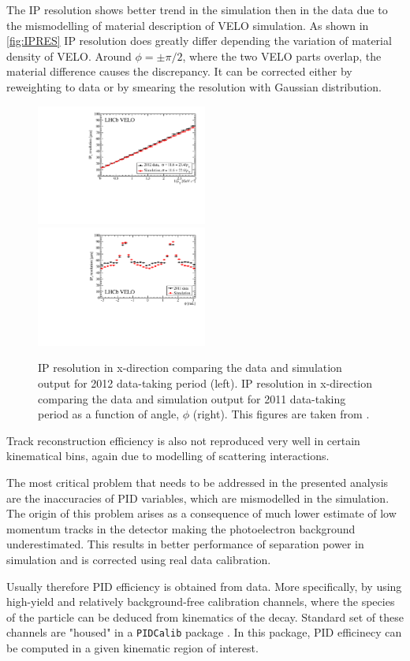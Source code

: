 The \Gls{IP} resolution shows better trend in the simulation then in the data due to the mismodelling of material description of \Gls{VELO} simulation. As shown in \autoref{fig:IPRES} \Gls{IP} resolution does greatly differ depending the variation of material density of \Gls{VELO}. Around $\phi=\pm\pi/2$, where the two \Gls{VELO} parts overlap, the material difference causes the discrepancy. It can be corrected either by reweighting to data or by smearing the resolution with Gaussian distribution.

\begin{figure}[!h]
	\centering
	\includegraphics[width = 0.5\textwidth]{figs/detector/IPXRes-Vs-InversePT-Compare2012DataToMC.pdf}%
	\includegraphics[width = 0.5\textwidth]{figs/detector/IPXRes-Vs-Phi-Compare2011DataToMC.pdf}%
	\caption{\Gls{IP} resolution in x-direction comparing the data and simulation output for 2012 data-taking period (left). \Gls{IP} resolution in x-direction comparing the data and simulation output for 2011 data-taking period as a function of angle, $\phi$ (right). This figures are taken from \cite{LHCbVELOGroup:2014uea}. }  
	\label{fig:IPRES}
\end{figure}


Track reconstruction efficiency is also not reproduced very well in certain kinematical bins, again due to modelling of scattering interactions.

The most critical problem that needs to be addressed in the presented analysis are the inaccuracies of \Gls{PID} variables, which are mismodelled in the simulation. The origin of this problem arises as a consequence of much lower estimate of low momentum tracks in the detector making the photoelectron background underestimated. This results in better performance of separation power in simulation and is corrected using real data calibration. 

Usually therefore PID efficiency is obtained from data. More specifically, by using high-yield and relatively background-free calibration channels, where the species of the particle can be deduced from kinematics of the decay. Standard set of these channels are "housed" in a \texttt{PIDCalib} package \cite{Anderlini:2202412}. In this package, PID efficinecy can be computed in a given kinematic region of interest. 


